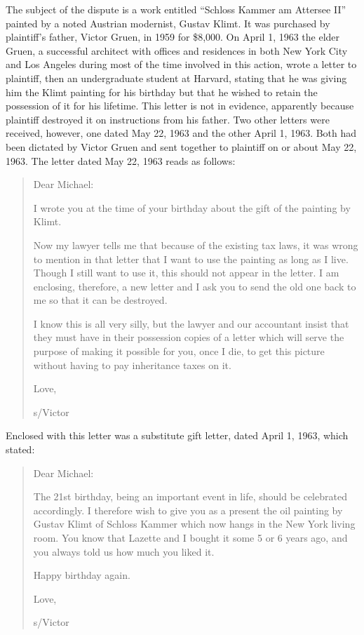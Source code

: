 The subject of the dispute is a work entitled ``Schloss Kammer am Attersee II''
painted by a noted Austrian modernist, Gustav Klimt. It was purchased by
plaintiff's father, Victor Gruen, in 1959 for \$8,000. On April 1, 1963 the
elder Gruen, a successful architect with offices and residences in both New
York City and Los Angeles during most of the time involved in this action,
wrote a letter to plaintiff, then an undergraduate student at Harvard, stating
that he was giving him the Klimt painting for his birthday but that he wished
to retain the possession of it for his lifetime. This letter is not in
evidence, apparently because plaintiff destroyed it on instructions from his
father. Two other letters were received, however, one dated May 22, 1963 and
the other April 1, 1963. Both had been dictated by Victor Gruen and sent
together to plaintiff on or about May 22, 1963. The letter dated May 22, 1963
reads as follows:
\begin{quotation}
\noindent Dear Michael:

I wrote you at the time of your birthday about the gift of the painting by
Klimt.

Now my lawyer tells me that because of the existing tax laws, it was wrong
to mention in that letter that I want to use the painting as long as I live.
Though I still want to use it, this should not appear in the letter. I am
enclosing, therefore, a new letter and I ask you to send the old one back to me
so that it can be destroyed.

I know this is all very silly, but the lawyer and our accountant insist that
they must have in their possession copies of a letter which will serve the
purpose of making it possible for you, once I die, to get this picture without
having to pay inheritance taxes on it.

\noindent Love,

\noindent s/Victor
\end{quotation}

Enclosed with this letter was a substitute gift letter, dated April 1, 1963,
which stated:

\begin{quotation}
\noindent Dear Michael:

The 21st birthday, being an important event in life, should be celebrated
accordingly. I therefore wish to give you as a present the oil painting by
Gustav Klimt of Schloss Kammer which now hangs in the New York living room. You
know that Lazette and I bought it some 5 or 6 years ago, and you always told us
how much you liked it.

Happy birthday again.

\noindent Love,

\noindent s/Victor
\end{quotation}

